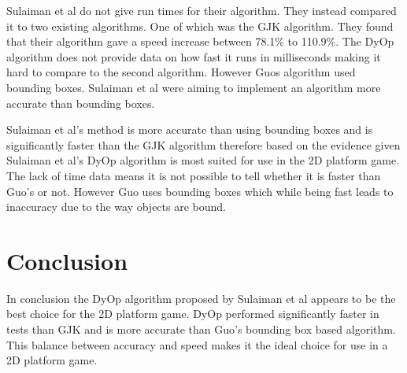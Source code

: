 \documentclass{scrartcl}
\begin{document}
Sulaiman et al do not give run times for their algorithm. They instead compared it to two existing algorithms. One of which was the GJK  algorithm. They found that their algorithm gave a speed increase  between 78.1\% to 110.9\%. The DyOp algorithm does not provide data on how fast it runs in milliseconds making it hard to compare to the second algorithm. However Guo\textsc{}s algorithm used bounding boxes. Sulaiman et al were aiming to implement an algorithm more accurate than bounding boxes.

Sulaiman et al's method is more accurate than using bounding boxes and is significantly faster than the GJK algorithm therefore based on the evidence given Sulaiman et al's DyOp algorithm is most suited for use in the 2D platform game. The lack of time data means it is not possible to tell whether it is faster than Guo's or not. However Guo uses bounding boxes which while being fast leads to inaccuracy due to the way objects are bound.  
		
\section{Conclusion}
In conclusion the DyOp algorithm proposed by Sulaiman et al appears to be the best choice for the 2D platform game. DyOp performed significantly faster in tests than GJK and is more accurate than Guo's bounding box based algorithm. This balance between accuracy and speed makes it the ideal choice for use in a 2D platform game.  
	
	


	
\end{document}
